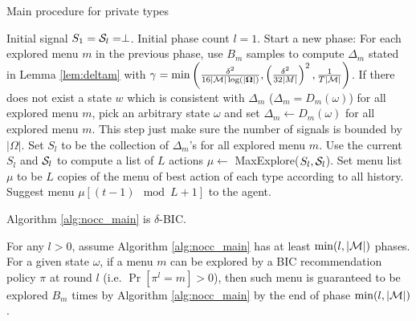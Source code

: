  \begin{algorithm}[H]
    \caption{Main procedure for private types }
    	\label{alg:nocc_main}
    \begin{algorithmic}[1]
    	\STATE Initial signal $S_1 = \S_l= \perp$.
	\STATE Initial phase count $l = 1$. 
			\STATE Start a new phase:
			\STATE For each explored menu $m$ in the previous phase, use $B_m$ samples to compute $\Delta_m$ stated in Lemma \ref{lem:deltam} with $\gamma =\min\left(\frac{\delta^2}{16|\M|\log(|\varOmega|)},\left( \frac{\delta^2}{32|M|}\right)^2, \frac{1}{T|\M|}\right)$. 
			\STATE If there does not exist a state $w$ which is consistent with $\Delta_m$ ($\Delta_m = D_m(\omega)$) for all explored menu $m$, pick an arbitrary state $\omega$ and set $\Delta_m \leftarrow D_m(\omega)$ for all explored menu $m$. This step just make sure the number of signals is bounded by $|\varOmega|$.
			\STATE Set $S_l$ to be the collection of $\Delta_m$'s for all explored menu $m$.
				\STATE Use the current $S_l$ and $\S_l$ to compute a list of $L$ actions $\mu \leftarrow $ MaxExplore($S_l, \S_l$).
			\ELSE
				\STATE Set menu list $\mu$ to be $L$ copies of the menu of best action of each type according to all history. 
			\ENDIF
		\ENDIF
		\STATE Suggest menu $\mu [ (t-1) \mod L + 1]$ to the agent.
	\ENDFOR
     \end{algorithmic}
\end{algorithm}


\begin{claim}
\label{clm:nocc_BIC}
Algorithm \ref{alg:nocc_main} is $\delta$-BIC.
\end{claim}


\begin{lemma}
\label{lem:exp_nocc}
For any $l > 0$, assume Algorithm \ref{alg:nocc_main} has at least $\min(l, |\M|)$ phases. 
For a given state $\omega$, if a menu $m$ can be explored by a BIC recommendation policy $\pi$ at round $l$ (i.e. $ \Pr[\pi^l= m]> 0$), then such menu is guaranteed to be explored $B_m$ times by Algorithm \ref{alg:nocc_main} by the end of phase $\min(l, |\M|)$. 
\end{lemma}

